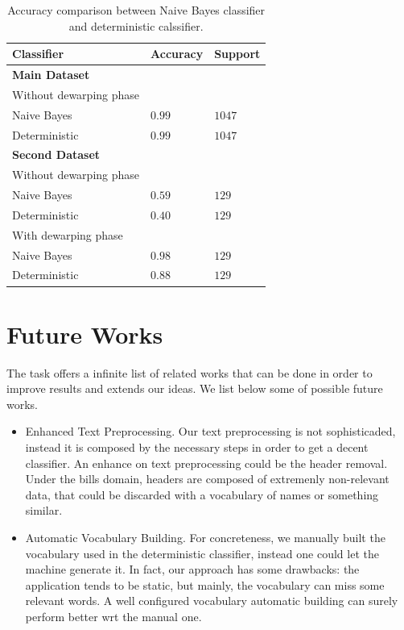 \documentclass[10pt,twocolumn,letterpaper]{article}
\begin{document}
\begin{table}[!h]
  \begin{center}
    \begin{tabular}{lll}
      \hline
      Classifier              & Accuracy & Support \\ \hline
      \textbf{Main Dataset}                        \\
      \small Without dewarping phase               \\
      \; \; Naive Bayes       & $0.99$   & $1047$  \\
      \; \; Deterministic     & $0.99$   & $1047$  \\ \hline

      \textbf{Second Dataset} &          &         \\
      \small Without dewarping phase               \\
      \; \; Naive Bayes       & $0.59$   & $129$   \\
      \; \; Deterministic     & $0.40$   & $129$   \\

      \small With dewarping phase                  \\
      \; \; Naive Bayes       & $0.98$   & $129$   \\
      \; \; Deterministic     & $0.88$   & $129$   \\ \hline
    \end{tabular}
  \end{center}
  \label{table:classifiers-comparison}
  \caption{Accuracy comparison between Naive Bayes classifier and
    deterministic calssifier.}
\end{table}

\section{Future Works}
\label{sec:future-works}

The task offers a infinite list of related works that can be done in
order to improve results and extends our ideas. We list below some of
possible future works.

\begin{itemize}
  \item Enhanced Text Preprocessing. Our text preprocessing is not
    sophisticaded, instead it is composed by the necessary steps in
    order to get a decent classifier. An enhance on text preprocessing
    could be the header removal. Under the bills domain, headers are
    composed of extremenly non-relevant data, that could be discarded
    with a vocabulary of names or something similar.
  \item Automatic Vocabulary Building. For concreteness, we manually
    built the vocabulary used in the deterministic classifier, instead
    one could let the machine generate it. In fact, our approach has
    some drawbacks: the application tends to be static, but mainly,
    the vocabulary can miss some relevant words. A well configured
    vocabulary automatic building can surely perform better wrt the
    manual one.
\end{itemize}
\end{document}
